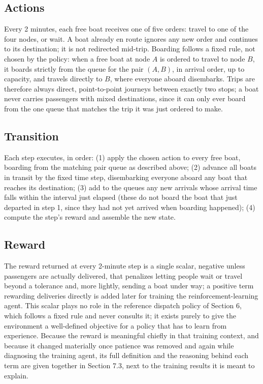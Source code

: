 \documentclass[11pt,a4paper]{article}
\begin{document}
\subsection{Actions}

Every 2 minutes, each free boat receives one of five orders: travel to one of the four nodes, or wait. A boat already en route ignores any new order and continues to its destination; it is not redirected mid-trip. Boarding follows a fixed rule, not chosen by the policy: when a free boat at node $A$ is ordered to travel to node $B$, it boards strictly from the queue for the pair $(A,B)$, in arrival order, up to capacity, and travels directly to $B$, where everyone aboard disembarks. Trips are therefore always direct, point-to-point journeys between exactly two stops; a boat never carries passengers with mixed destinations, since it can only ever board from the one queue that matches the trip it was just ordered to make.

\subsection{Transition}

Each step executes, in order: (1) apply the chosen action to every free boat, boarding from the matching pair queue as described above; (2) advance all boats in transit by the fixed time step, disembarking everyone aboard any boat that reaches its destination; (3) add to the queues any new arrivals whose arrival time falls within the interval just elapsed (these do not board the boat that just departed in step 1, since they had not yet arrived when boarding happened); (4) compute the step's reward and assemble the new state.

\subsection{Reward}

The reward returned at every 2-minute step is a single scalar, negative unless passengers are actually delivered, that penalizes letting people wait or travel beyond a tolerance and, more lightly, sending a boat under way; a positive term rewarding deliveries directly is added later for training the reinforcement-learning agent. This scalar plays no role in the reference dispatch policy of Section 6, which follows a fixed rule and never consults it; it exists purely to give the environment a well-defined objective for a policy that has to learn from experience. Because the reward is meaningful chiefly in that training context, and because it changed materially once patience was removed and again while diagnosing the training agent, its full definition and the reasoning behind each term are given together in Section 7.3, next to the training results it is meant to explain.
\end{document}
